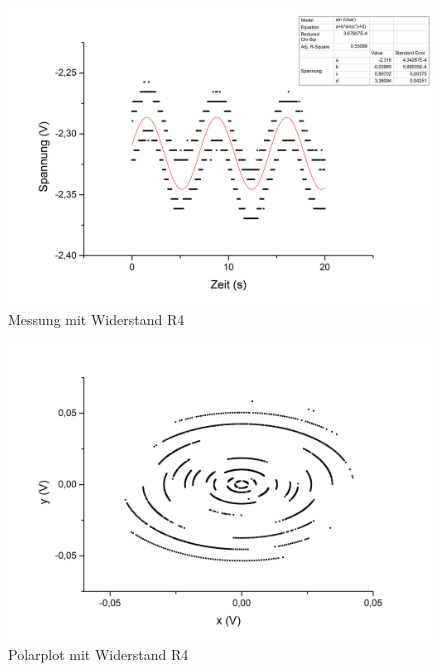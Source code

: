 \begin{figure}[h]
\begin{center}
\includegraphics[scale=0.6]{Bilder/w4}
\caption{Messung mit Widerstand R4}
\end{center}
\end{figure}
\begin{figure}[h]
\begin{center}
\includegraphics[scale=0.6]{Bilder/pw4}
\caption{Polarplot mit Widerstand R4}
\end{center}
\end{figure}
